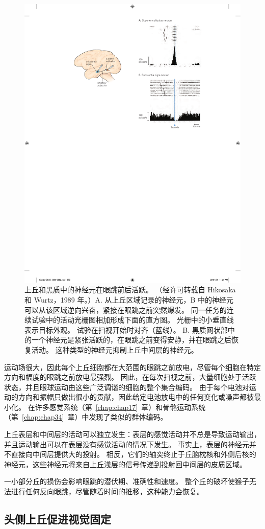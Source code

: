 \begin{figure}[htbp]
	\centering
	\includegraphics[width=0.5\linewidth]{chap35/fig_35_11}
	\caption{上丘和黑质中的神经元在眼跳前后活跃。 （经许可转载自 Hikosaka 和 Wurtz，1989 年。）A. 从上丘区域记录的神经元，B 中的神经元可以从该区域逆向兴奋，紧接在眼跳之前突然爆发。 同一任务的连续试验中的活动光栅图相加形成下面的直方图。 光栅中的小垂直线表示目标外观。 试验在扫视开始时对齐（蓝线）。 B. 黑质网状部中的一个神经元是紧张活跃的，在眼跳之前变得安静，并在眼跳之后恢复活动。 这种类型的神经元抑制上丘中间层的神经元。}
	\label{fig:35_11}
\end{figure}


运动场很大，因此每个上丘细胞都在大范围的眼跳之前放电，尽管每个细胞在特定方向和幅度的眼跳之前放电最强烈。
因此，在每次扫视之前，大量细胞处于活跃状态，并且眼球运动由这些广泛调谐的细胞的整个集合编码。
由于每个电池对运动的方向和振幅只做出很小的贡献，因此给定电池放电中的任何变化或噪声都被最小化。
在许多感觉系统（第~\ref{chap:chap17}~章）和骨骼运动系统（第~\ref{chap:chap34}~章）中发现了类似的群体编码。


上丘表层和中间层的活动可以独立发生：表层的感觉活动并不总是导致运动输出，并且运动输出可以在表层没有感觉活动的情况下发生。
事实上，表层的神经元并不直接向中间层提供大的投射。 相反，它们的轴突终止于丘脑枕核和外侧后核的神经元，这些神经元将来自上丘浅层的信号传递到投射回中间层的皮质区域。


一小部分丘的损伤会影响眼跳的潜伏期、准确性和速度。
整个丘的破坏使猴子无法进行任何反向眼跳，尽管随着时间的推移，这种能力会恢复。



\subsection{头侧上丘促进视觉固定}

